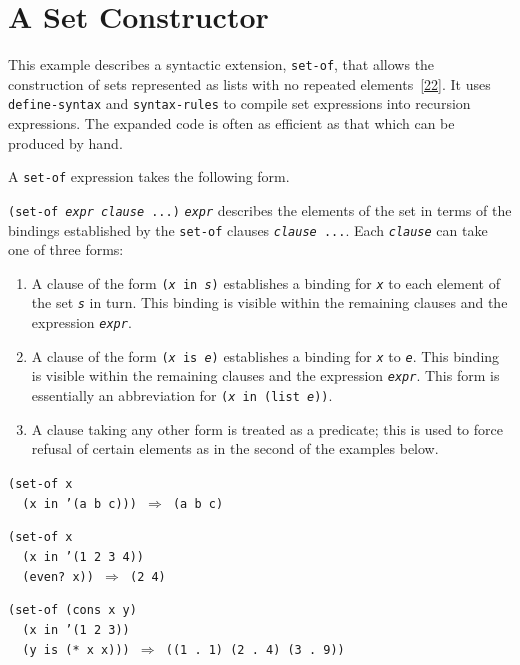 \section{\label{examples_g162}\label{examples_h3}A Set Constructor\label{examples_SECTEXSETS}}



This example describes a syntactic extension, \label{examples_s15}\texttt{set-of}, that allows
the construction of \label{examples_s16}sets represented as lists with no repeated
elements [\hyperref[bibliography_g240]{22}].
It uses \label{examples_s17}\texttt{define-syntax} and
\label{examples_s18}\texttt{syntax-rules}
to compile set expressions into recursion expressions.
The expanded code is often as efficient as that which can be
produced by hand.


A \texttt{set-of} expression takes the following form.


\texttt{(set-of \textit{expr} \textit{clause} ...)}
\texttt{\textit{expr}} describes the elements of the set in terms of the bindings
established by the \texttt{set-of} clauses \texttt{\textit{clause} ...}.
Each \texttt{\textit{clause}} can take one of three forms:
\begin{enumerate}
\label{examples_g163}\item 
A clause of the form \texttt{(\textit{x} in \textit{s})} establishes a
binding for \texttt{\textit{x}} to each element of the set \texttt{\textit{s}} in turn.
This binding is visible within the remaining clauses
and the expression \texttt{\textit{expr}}.


\label{examples_g164}\item 
A clause of the form \texttt{(\textit{x} is \textit{e})} establishes a binding
for \texttt{\textit{x}} to \texttt{\textit{e}}.
This binding is visible within the remaining clauses
and the expression \texttt{\textit{expr}}.
This form is essentially an abbreviation for \texttt{(\textit{x} in (list \textit{e}))}.



\label{examples_g165}\item 
A clause taking any other form is treated as a predicate; this is
used to force refusal of certain elements as in the second of the
examples below.

\end{enumerate}


\begin{alltt}
(set-of x
  (x in '(a b c))) \(\Rightarrow\) (a b c)

(set-of x
  (x in '(1 2 3 4))
  (even? x)) \(\Rightarrow\) (2 4)

(set-of (cons x y)
  (x in '(1 2 3))
  (y is (* x x))) \(\Rightarrow\) ((1 . 1) (2 . 4) (3 . 9))
\end{alltt}


